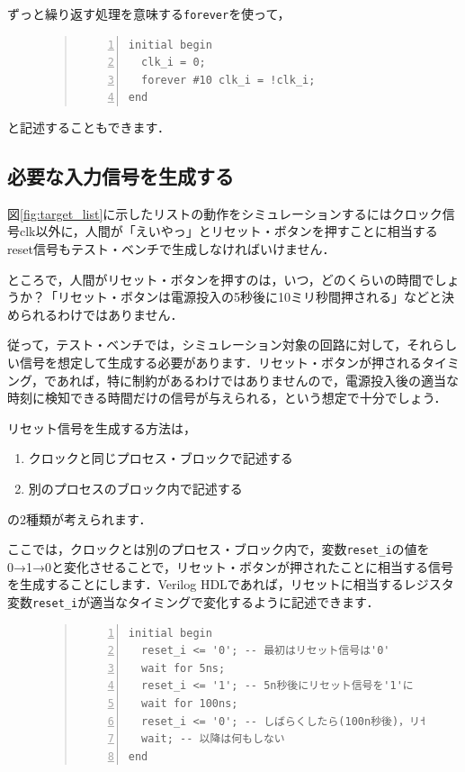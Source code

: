\documentclass[a4paper,dvipdfmx]{jsarticle}
\begin{document}
ずっと繰り返す処理を意味する\verb|forever|を使って，
\begin{figure}[H]
\begin{quote}
\begin{Verbatim}[frame=single, numbers=left, baselinestretch=0.8]
initial begin
  clk_i = 0;
  forever #10 clk_i = !clk_i;
end
\end{Verbatim}
\end{quote}
\end{figure}
と記述することもできます．

\subsection{必要な入力信号を生成する}

図\ref{fig:target_list}に示したリストの動作をシミュレーションするにはクロック信号clk以外に，人間が「えいやっ」とリセット・ボタンを押すことに相当するreset信号もテスト・ベンチで生成しなければいけません．

ところで，人間がリセット・ボタンを押すのは，いつ，どのくらいの時間でしょうか？「リセット・ボタンは電源投入の5秒後に10ミリ秒間押される」などと決められるわけではありません．

従って，テスト・ベンチでは，シミュレーション対象の回路に対して，それらしい信号を想定して生成する必要があります．リセット・ボタンが押されるタイミング，であれば，特に制約があるわけではありませんので，電源投入後の適当な時刻に検知できる時間だけの信号が与えられる，という想定で十分でしょう．

リセット信号を生成する方法は，
\begin{enumerate}
 \item クロックと同じプロセス・ブロックで記述する
 \item 別のプロセスのブロック内で記述する
\end{enumerate}
の2種類が考えられます．

ここでは，クロックとは別のプロセス・ブロック内で，変数\verb|reset_i|の値を0→1→0と変化させることで，リセット・ボタンが押されたことに相当する信号を生成することにします．Verilog HDLであれば，リセットに相当するレジスタ変数\verb|reset_i|が適当なタイミングで変化するように記述できます．
\begin{figure}[H]
\begin{quote}
\begin{Verbatim}[frame=single, numbers=left, baselinestretch=0.8]
initial begin
  reset_i <= '0'; -- 最初はリセット信号は'0'
  wait for 5ns;
  reset_i <= '1'; -- 5n秒後にリセット信号を'1'に
  wait for 100ns;
  reset_i <= '0'; -- しばらくしたら(100n秒後)，リセット信号を'0'に
  wait; -- 以降は何もしない
end
\end{Verbatim}
\end{quote}
\end{figure}
\end{document}
